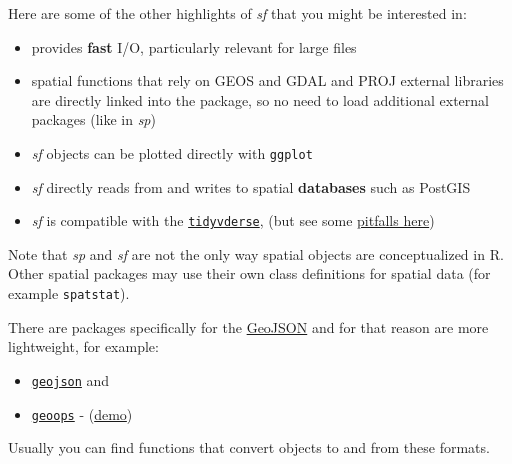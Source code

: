 \documentclass[
  11pt,
]{book}
\providecommand{\tightlist}{%
  \setlength{\itemsep}{0pt}\setlength{\parskip}{0pt}}
\begin{document}
Here are some of the other highlights of \emph{sf} that you might be interested in:

\begin{itemize}
\item
  provides \textbf{fast} I/O, particularly relevant for large files
\item
  spatial functions that rely on GEOS and GDAL and PROJ external libraries are directly linked into the package, so no need to load additional external packages (like in \emph{sp})\\
\item
  \emph{sf} objects can be plotted directly with \texttt{ggplot}
\item
  \emph{sf} directly reads from and writes to spatial \textbf{databases} such as PostGIS
\item
  \emph{sf} is compatible with the \href{https://www.tidyverse.org/}{\texttt{tidyvderse}}, (but see some \href{https://geocompr.github.io/geocompkg/articles/tidyverse-pitfalls.html}{pitfalls here})
\end{itemize}

Note that \emph{sp} and \emph{sf} are not the only way spatial objects are conceptualized in R. Other spatial packages may use their own class definitions for spatial data (for example \texttt{spatstat}).

There are packages specifically for the \href{https://tools.ietf.org/html/rfc7946}{GeoJSON} and for that reason are more lightweight, for example:

\begin{itemize}
\tightlist
\item
  \href{https://cran.r-project.org/package=geojson}{\texttt{geojson}} and\\
\item
  \href{https://CRAN.R-project.org/package=geoops}{\texttt{geoops}} - (\href{https://cran.r-project.org/web/packages/geoops/vignettes/geoops_vignette.html}{demo})
\end{itemize}

Usually you can find functions that convert objects to and from these formats.
\end{document}
